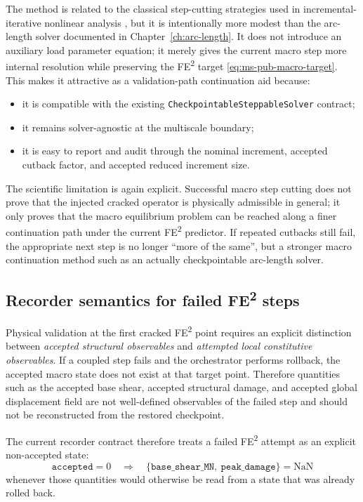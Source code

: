 The method is related to the classical step-cutting strategies used in
incremental-iterative nonlinear analysis \cite{Crisfield1981,Deuflhard2011},
but it is intentionally more modest than the arc-length solver documented in
Chapter~\ref{ch:arc-length}.  It does not introduce an auxiliary load
parameter equation; it merely gives the current macro step more internal
resolution while preserving the FE\textsuperscript{2} target
\eqref{eq:ms-pub-macro-target}.  This makes it attractive as a validation-path
continuation aid because:
\begin{itemize}
  \item it is compatible with the existing
    \texttt{CheckpointableSteppableSolver} contract;
  \item it remains solver-agnostic at the multiscale boundary;
  \item it is easy to report and audit through the nominal increment,
    accepted cutback factor, and accepted reduced increment size.
\end{itemize}

The scientific limitation is again explicit.  Successful macro step cutting
does not prove that the injected cracked operator is physically admissible in
general; it only proves that the macro equilibrium problem can be reached
along a finer continuation path under the current FE\textsuperscript{2}
predictor.  If repeated cutbacks still fail, the appropriate next step is no
longer ``more of the same'', but a stronger macro continuation method such as
an actually checkpointable arc-length solver.

\subsection{Recorder semantics for failed FE\textsuperscript{2} steps}
\label{sec:ms-pub-failed-step-recorder-semantics}

Physical validation at the first cracked FE\textsuperscript{2} point requires
an explicit distinction between \emph{accepted structural observables} and
\emph{attempted local constitutive observables}.  If a coupled step fails and
the orchestrator performs rollback, the accepted macro state does not exist at
that target point.  Therefore quantities such as the accepted base shear,
accepted structural damage, and accepted global displacement field are not
well-defined observables of the failed step and should not be reconstructed
from the restored checkpoint.

The current recorder contract therefore treats a failed FE\textsuperscript{2}
attempt as an explicit non-accepted state:
\begin{equation}
  \texttt{accepted} = 0
  \quad\Longrightarrow\quad
  \{\texttt{base\_shear\_MN},\ \texttt{peak\_damage}\}
  = \mathrm{NaN}
  \label{eq:ms-pub-failed-step-nan-contract}
\end{equation}
whenever those quantities would otherwise be read from a state that was
already rolled back.

